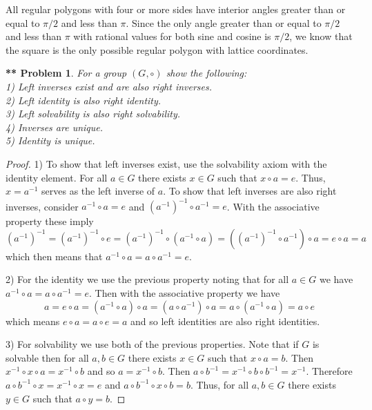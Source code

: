 \documentclass{article}
\newtheorem{**}{** Problem}
\begin{document}
\begin{flushleft}
All regular polygons with four or more sides have interior angles greater than or equal to $\pi/2$ and less than $\pi$. Since the only angle greater than or equal to $\pi/2$ and less than $\pi$ with rational values for both sine and cosine is $\pi/2$, we know that the square is the only possible regular polygon with lattice coordinates.

\begin{**}
For a group $(G, \circ)$ show the following:\\
1) Left inverses exist and are also right inverses.\\
2) Left identity is also right identity.\\
3) Left solvability is also right solvability.\\
4) Inverses are unique.\\
5) Identity is unique.
\end{**}
\begin{proof}
1) To show that left inverses exist, use the solvability axiom with the identity element. For all $a \in G$ there exists $x \in G$ such that $x \circ a = e$. Thus, $x = a^{-1}$ serves as the left inverse of $a$. To show that left inverses are also right inverses, consider $a^{-1} \circ a = e$ and $\left ( a^{-1} \right )^{-1} \circ a^{-1} = e$. With the associative property these imply
\[
\left ( a^{-1} \right )^{-1} = \left ( a^{-1} \right )^{-1} \circ e = \left ( a^{-1} \right )^{-1} \circ \left (a^{-1} \circ a \right ) = \left ( \left (a^{-1} \right )^{-1} \circ a^{-1} \right ) \circ a = e \circ a = a
\]
which then means that $a^{-1} \circ a = a \circ a^{-1} = e$.\newline

2) For the identity we use the previous property noting that for all $a \in G$ we have $a^{-1} \circ a = a \circ a^{-1} = e$. Then with the associative property we have
\[
a = e \circ a = \left (a^{-1} \circ a \right ) \circ a = \left (a \circ a^{-1} \right ) \circ a = a \circ \left (a^{-1} \circ a \right ) = a \circ e
\]
which means $e \circ a = a \circ e = a$ and so left identities are also right identities.\newline

3) For solvability we use both of the previous properties. Note that if $G$ is solvable then for all $a,b \in G$ there exists $x \in G$ such that $x \circ a = b$. Then $x^{-1} \circ x \circ a = x^{-1} \circ b$ and so $a = x^{-1} \circ b$. Then $a \circ b^{-1} = x^{-1} \circ b \circ b^{-1} = x^{-1}$. Therefore $a \circ b^{-1} \circ x = x^{-1} \circ x = e$ and $a \circ b^{-1} \circ x \circ b = b$. Thus, for all $a, b \in G$ there exists $y \in G$ such that $a \circ y = b$.\newline


\end{proof}
\end{flushleft}
\end{document}
